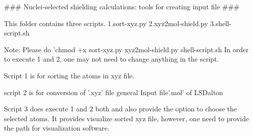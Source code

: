 ### Nuclei-selected shielding calculations: tools for creating input file ###

This folder contains three scripts. 
1.sort-xyz.py
2.xyz2mol-shield.py
3.shell-script.sh

Note: Please do 'chmod +x sort-xyz.py xyz2mol-shield.py shell-script.sh
In order to execute 1 and 2, one may not need to change anything in the script. 

Script 1 is for sorting the atoms in xyz file. 

script 2 is for conversion of '.xyz' file general Input file'.mol' of LSDalton 

Script 3 does execute 1 and 2 both and also provide the option to choose the selected atoms. It provides visualize sorted xyz file, however, one need to provide the path for visualization software.  
